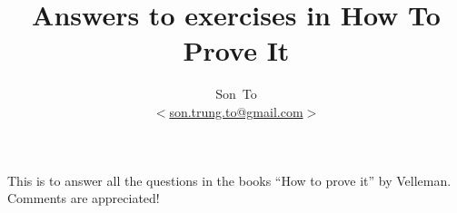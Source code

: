 \documentclass[a4paper,11pt]{article}
\author{Son~To\\
$<$\href{mailto:son.trung.to@gmail.com}{son.trung.to@gmail.com}$>$}
\affil{StaffPoint Oy}
\title{Answers to exercises in How To Prove It}
\theoremstyle{plain} \newtheorem{id}{Lemma}[section]
\theoremstyle{definition} \newtheorem{ex}{Exercise}[subsection]
\theoremstyle{remark}     \newtheorem{ab}{Conjecture}[section]
\begin{document}
  \maketitle
  This is to answer all the questions in the books ``How to prove it'' by Velleman.
  Comments are appreciated!

  \clearpage
  \tableofcontents
  \clearpage

  
  
\end{document}
